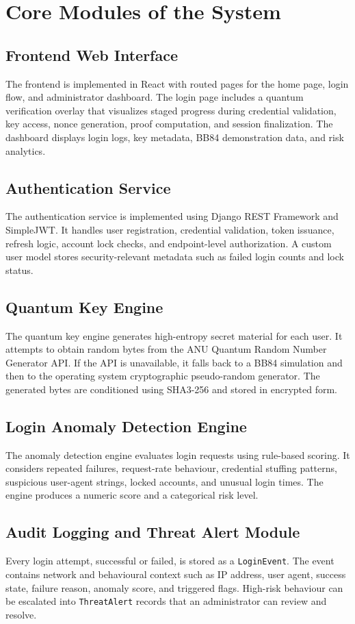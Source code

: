 \section{Core Modules of the System}

\subsection{Frontend Web Interface}
The frontend is implemented in React with routed pages for the home page, login flow, and administrator dashboard. The login page includes a quantum verification overlay that visualizes staged progress during credential validation, key access, nonce generation, proof computation, and session finalization. The dashboard displays login logs, key metadata, BB84 demonstration data, and risk analytics.

\subsection{Authentication Service}
The authentication service is implemented using Django REST Framework and SimpleJWT. It handles user registration, credential validation, token issuance, refresh logic, account lock checks, and endpoint-level authorization. A custom user model stores security-relevant metadata such as failed login counts and lock status.

\subsection{Quantum Key Engine}
The quantum key engine generates high-entropy secret material for each user. It attempts to obtain random bytes from the ANU Quantum Random Number Generator API. If the API is unavailable, it falls back to a BB84 simulation and then to the operating system cryptographic pseudo-random generator. The generated bytes are conditioned using SHA3-256 and stored in encrypted form.

\subsection{Login Anomaly Detection Engine}
The anomaly detection engine evaluates login requests using rule-based scoring. It considers repeated failures, request-rate behaviour, credential stuffing patterns, suspicious user-agent strings, locked accounts, and unusual login times. The engine produces a numeric score and a categorical risk level.

\subsection{Audit Logging and Threat Alert Module}
Every login attempt, successful or failed, is stored as a \texttt{LoginEvent}. The event contains network and behavioural context such as IP address, user agent, success state, failure reason, anomaly score, and triggered flags. High-risk behaviour can be escalated into \texttt{ThreatAlert} records that an administrator can review and resolve.

